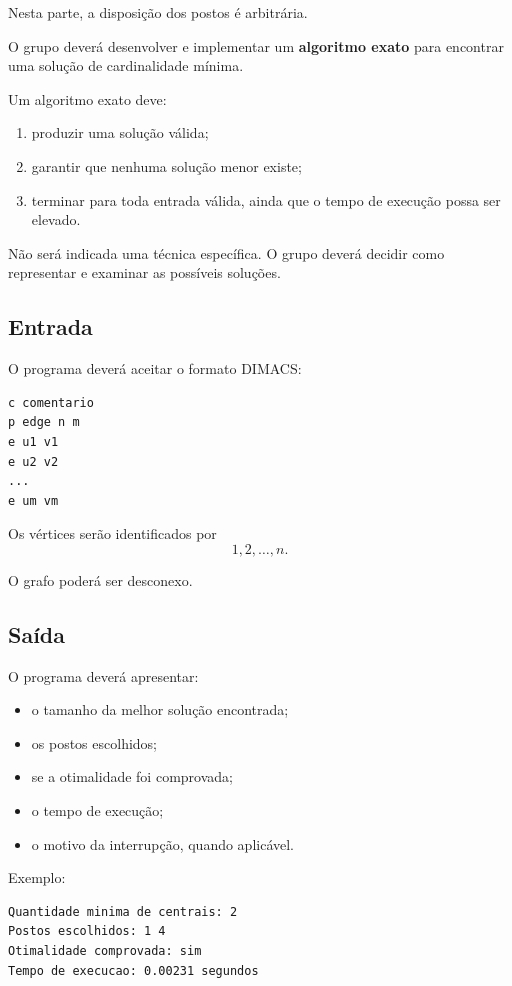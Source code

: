 \documentclass[11pt,a4paper]{article}
\begin{document}
Nesta parte, a disposição dos postos é arbitrária.

O grupo deverá desenvolver e implementar um \textbf{algoritmo exato} para encontrar uma solução de cardinalidade mínima.

Um algoritmo exato deve:

\begin{enumerate}
    \item produzir uma solução válida;
    \item garantir que nenhuma solução menor existe;
    \item terminar para toda entrada válida, ainda que o tempo de execução possa ser elevado.
\end{enumerate}

Não será indicada uma técnica específica. O grupo deverá decidir como representar e examinar as possíveis soluções.

\subsection{Entrada}

O programa deverá aceitar o formato DIMACS:

\begin{lstlisting}
c comentario
p edge n m
e u1 v1
e u2 v2
...
e um vm
\end{lstlisting}

Os vértices serão identificados por
\[
1,2,\ldots,n.
\]

O grafo poderá ser desconexo.

\subsection{Saída}

O programa deverá apresentar:

\begin{itemize}
    \item o tamanho da melhor solução encontrada;
    \item os postos escolhidos;
    \item se a otimalidade foi comprovada;
    \item o tempo de execução;
    \item o motivo da interrupção, quando aplicável.
\end{itemize}

Exemplo:

\begin{lstlisting}
Quantidade minima de centrais: 2
Postos escolhidos: 1 4
Otimalidade comprovada: sim
Tempo de execucao: 0.00231 segundos
\end{lstlisting}
\end{document}
